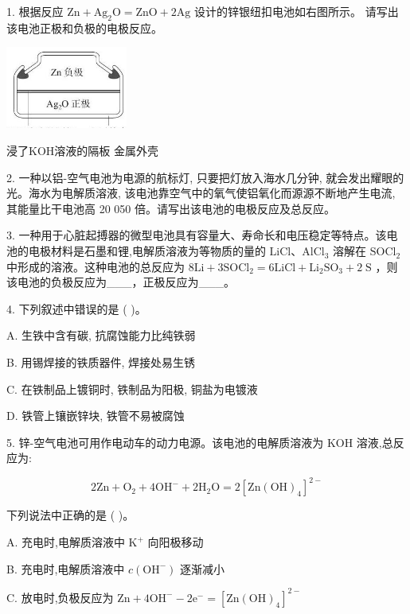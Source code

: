 \documentclass[10pt]{article}
\begin{document}
1. 根据反应 \(\mathrm{{Zn}} + {\mathrm{{Ag}}}_{2}\mathrm{O} = \mathrm{{ZnO}} + 2\mathrm{{Ag}}\) 设计的锌银纽扣电池如右图所示。 请写出该电池正极和负极的电极反应。

\begin{center}
\includegraphics[max width=0.3\textwidth]{images/0190da9d-8bfd-732f-bc2c-0b21d0f13b91_124_817525.jpg}
\end{center}

浸了KOH溶液的隔板 金属外壳

2. 一种以铝-空气电池为电源的航标灯, 只要把灯放入海水几分钟, 就会发出耀眼的光。海水为电解质溶液, 该电池靠空气中的氧气使铝氧化而源源不断地产生电流, 其能量比干电池高 20 050 倍。请写出该电池的电极反应及总反应。

3. 一种用于心脏起搏器的微型电池具有容量大、寿命长和电压稳定等特点。该电池的电极材料是石墨和锂,电解质溶液为等物质的量的 \(\mathrm{{LiCl}}\text{、}{\mathrm{{AlCl}}}_{3}\) 溶解在 \({\mathrm{{SOCl}}}_{2}\) 中形成的溶液。这种电池的总反应为 \(8\mathrm{{Li}} + 3{\mathrm{{SOCl}}}_{2} = 6\mathrm{{LiCl}} + {\mathrm{{Li}}}_{2}{\mathrm{{SO}}}_{3} + 2\mathrm{\;S}\) ，则该电池的负极反应为\_\_\_，正极反应为\_\_\_。

4. 下列叙述中错误的是 ( )。

A. 生铁中含有碳, 抗腐蚀能力比纯铁弱

B. 用锡焊接的铁质器件, 焊接处易生锈

C. 在铁制品上镀铜时, 铁制品为阳极, 铜盐为电镀液

D. 铁管上镶嵌锌块, 铁管不易被腐蚀

5. 锌-空气电池可用作电动车的动力电源。该电池的电解质溶液为 \(\mathrm{{KOH}}\) 溶液,总反应为:

\[
2\mathrm{{Zn}} + {\mathrm{O}}_{2} + 4{\mathrm{{OH}}}^{ - } + 2{\mathrm{H}}_{2}\mathrm{O} = 2{\left\lbrack \mathrm{{Zn}}{\left( \mathrm{{OH}}\right) }_{4}\right\rbrack }^{2 - }
\]

下列说法中正确的是 ( )。

A. 充电时,电解质溶液中 \({\mathrm{K}}^{ + }\) 向阳极移动

B. 充电时,电解质溶液中 \(c\left( {\mathrm{{OH}}}^{ - }\right)\) 逐渐减小

C. 放电时,负极反应为 \(\mathrm{{Zn}} + 4{\mathrm{{OH}}}^{ - } - 2{\mathrm{e}}^{ - } = {\left\lbrack \mathrm{{Zn}}{\left( \mathrm{{OH}}\right) }_{4}\right\rbrack }^{2 - }\)
\end{document}
